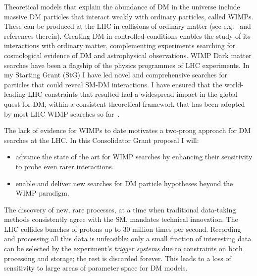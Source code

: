 \documentclass[11pt,a4paper]{article}
\begin{document}
Theoretical models that explain the abundance of DM in the universe include massive DM particles that interact weakly with ordinary particles, called WIMPs. These can be produced at the LHC in collisions of ordinary matter (see e.g.~\cite{Boveia:2018yeb} and references therein). 
Creating DM in controlled conditions enables the study of its interactions with ordinary matter, complementing experiments searching for cosmological evidence of DM and astrophysical observations. %
WIMP Dark matter searches have been a flagship of the physics programmes of LHC experiments. In my Starting Grant (StG) I have led novel and comprehensive searches for particles that could reveal SM-DM interactions. I have ensured that the world-leading LHC constraints that resulted had a widespread impact in the global quest for DM, within a consistent theoretical framework that has been adopted by most LHC WIMP searches so far~\cite{Abercrombie:2015wmb}.  

The lack of evidence for WIMPs to date motivates a two-prong approach for DM searches at the LHC. In this Consolidator Grant proposal I will:
\begin{itemize}
    \item advance the state of the art for WIMP searches by enhancing their sensitivity to probe even rarer interactions.%
    \item enable and deliver new searches for DM particle hypotheses beyond the WIMP paradigm. 
\end{itemize}

The discovery of new, rare processes, at a time when traditional data-taking methods consistently agree with the SM, mandates technical innovation. The LHC collides bunches of protons up to 30 million times per second. Recording and processing all this data is unfeasible: only a small fraction of interesting data can be selected by the experiment’s \textit{trigger systems} due to constraints on both processing and storage; the rest is discarded forever. This leads to a loss of sensitivity to large areas of parameter space for DM models. 
\end{document}

